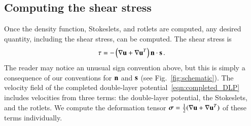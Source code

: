 \documentclass[preprint, 10pt]{elsarticle}
\begin{document}
\subsection{Computing the shear stress}
\label{sec:shearStressLP}
Once the density function, Stokeslets, and rotlets are computed, any desired quantity, including the shear stress, can be computed.  The shear stress is
\begin{align}
  \tau = -\left(\nabla \uu + \nabla \uu^T \right)\nn \cdot \ss \, .
\end{align}
The reader may notice an unusual sign convention above, but this is simply a consequence of our conventions for $\nn$ and $\ss$ (see Fig.~\ref{fig:schematic}).  The velocity field of the completed double-layer potential~\eqref{eqn:completed_DLP} includes velocities from three terms: the double-layer potential, the Stokeslets, and the rotlets.  We compute the deformation tensor $\ssigma = \frac{1}{2}(\nabla\uu + \nabla\uu^T)$ of these terms individually.
\end{document}
